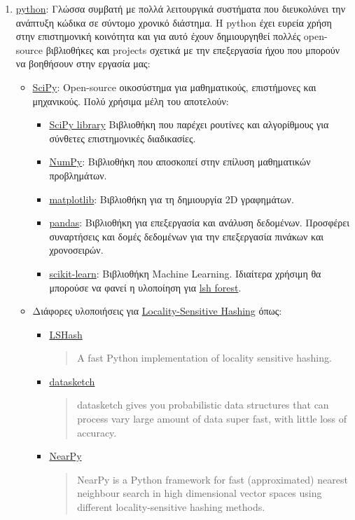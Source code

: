 \begin{enumerate}
    \item \href{https://www.python.org/}{python}:
    Γλώσσα συμβατή με πολλά λειτουργικά συστήματα που διευκολύνει την ανάπτυξη κώδικα σε σύντομο χρονικό διάστημα.
    Η python έχει ευρεία χρήση στην επιστημονική κοινότητα και για αυτό έχουν δημιουργηθεί πολλές open-source βιβλιοθήκες και projects σχετικά με την επεξεργασία ήχου που μπορούν να βοηθήσουν στην εργασία μας:
    \begin{itemize}
        \item \href{https://www.scipy.org/}{SciPy}:
        Open-source οικοσύστημα για μαθηματικούς, επιστήμονες και μηχανικούς.
        Πολύ χρήσιμα μέλη του αποτελούν:
        \begin{itemize}
        \item \href{https://www.scipy.org/scipylib/index.html}{SciPy library}
        Βιβλιοθήκη που παρέχει ρουτίνες και αλγορίθμους για σύνθετες επιστημονικές διαδικασίες.
        \item \href{http://www.numpy.org/}{NumPy}:
        Βιβλιοθήκη που αποσκοπεί στην επίλυση μαθηματικών προβλημάτων.
        \item \href{http://matplotlib.org/}{matplotlib}:
        Βιβλιοθήκη για τη δημιουργία 2D γραφημάτων.
        \item \href{http://pandas.pydata.org/}{pandas}:
        Βιβλιοθήκη για επεξεργασία και ανάλυση δεδομένων.
        Προσφέρει συναρτήσεις και δομές δεδομένων για την επεξεργασία πινάκων και χρονοσειρών.
        \item \href{http://scikit-learn.org/stable/}{scikit-learn}:
        Βιβλιοθήκη Machine Learning.
        Ιδιαίτερα χρήσιμη θα μπορούσε να φανεί η υλοποίηση για \href{http://scikit-learn.org/stable/modules/generated/sklearn.neighbors.LSHForest.html#sklearn.neighbors.LSHForest}{lsh forest}.
        \end{itemize}

        \item Διάφορες υλοποιήσεις για \hyperref[sub:lsh]{Locality-Sensitive Hashing} όπως:
        \begin{itemize}
        \item \href{https://github.com/kayzhu/LSHash}{LSHash}
        \blockquote{A fast Python implementation of locality sensitive hashing.}
        \item \href{https://github.com/ekzhu/datasketch}{datasketch}
        \blockquote{datasketch gives you probabilistic data structures that can process vary large amount of data super fast, with little loss of accuracy.}
        \item \href{https://github.com/pixelogik/NearPy}{NearPy}
        \blockquote{NearPy is a Python framework for fast (approximated) nearest neighbour search in high dimensional vector spaces using different locality-sensitive hashing methods.}
        \end{itemize}


\end{itemize}
\end{enumerate}
